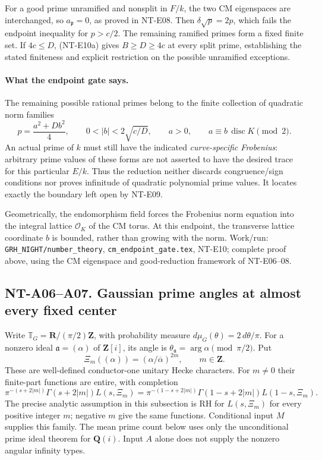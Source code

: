 For a good prime unramified and nonsplit in $F/k$, the two CM
eigenspaces are interchanged, so $a_{\mathfrak p}=0$, as proved in
NT-E08. Then $\delta\sqrt p=2p$, which fails the endpoint
inequality for $p>c/2$. The remaining ramified primes form a
fixed finite set. If $4c\le D$, (NT-E10a) gives $B\ge D\ge4c$
at every split prime, establishing the stated finiteness and
explicit restriction on the possible unramified exceptions.

\paragraph{What the endpoint gate says.}
The remaining possible rational primes belong to the finite
collection of quadratic norm families
\[
 p=\frac{a^2+Db^2}{4},\qquad
 0<|b|<2\sqrt{c/D},\qquad
 a>0,\qquad a\equiv b\,\operatorname{disc}K\pmod2.        \tag{NT-E10g}
\]
An actual prime of $k$ must still have the indicated
\emph{curve-specific Frobenius}: arbitrary prime values of these
forms are not asserted to have the desired trace for this
particular $E/k$. Thus the reduction neither discards
congruence/sign conditions nor proves infinitude of quadratic
polynomial prime values. It locates exactly the boundary left
open by NT-E09.

Geometrically, the endomorphism field forces the Frobenius norm
equation into the integral lattice $\mathcal O_K$ of the CM
torus. At this endpoint, the transverse lattice coordinate $b$
is bounded, rather than growing with the norm. Work/run:
\texttt{GRH\_NIGHT/number\_theory},
\texttt{cm\_endpoint\_gate.tex}, NT-E10; complete proof above,
using the CM eigenspace and good-reduction framework of NT-E06--08.

\subsection*{NT-A06--A07. Gaussian prime angles at almost every fixed center}

Write \(\mathbb T_G=\mathbf R/(\pi/2)\mathbf Z\), with probability
measure \(d\mu_G(\theta)=2\,d\theta/\pi\). For a nonzero ideal
\(\mathfrak a=(\alpha)\) of \(\mathbf Z[i]\), its angle is
\(\theta_{\mathfrak a}=\arg\alpha\pmod{\pi/2}\). Put
\[
 \Xi_m((\alpha))=(\alpha/\overline\alpha)^{2m},
 \qquad m\in\mathbf Z .
\]
These are well-defined conductor-one unitary Hecke characters.
For \(m\ne0\) their finite-part functions are entire, with completion
\[
 \pi^{-(s+2|m|)}\Gamma(s+2|m|)L(s,\Xi_m)
 =
 \pi^{-(1-s+2|m|)}\Gamma(1-s+2|m|)L(1-s,\Xi_m).
\]
The precise analytic assumption in this subsection is RH for
\(L(s,\Xi_m)\) for every positive integer \(m\); negative \(m\)
give the same functions. Conditional input \(M\) supplies this family.
The mean prime count below uses only the unconditional prime ideal
theorem for \(\mathbf Q(i)\). Input \(A\) alone does not supply the
nonzero angular infinity types.

